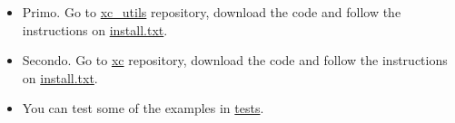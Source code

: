 \begin{itemize}
\item Primo. Go to \href{https://github.com/xcfem/xc_utils}{xc\_utils} repository, download the code and follow the instructions on \href{https://github.com/xcfem/xc_utils/blob/master/install.txt}{install.txt}.
\item Secondo. Go to \href{https://github.com/xcfem/xc}{xc} repository, download the code and follow the instructions on \href{https://github.com/xcfem/xc/blob/master/install.txt}{install.txt}.
\item You can test some of the examples in \href{https://github.com/xcfem/xc/tree/master/verif/tests}{tests}.
\end{itemize}






